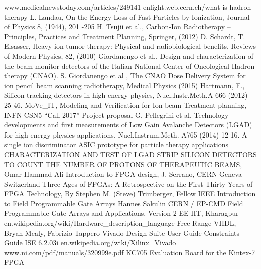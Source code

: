 \begin{thebibliography}{00}	
	www.medicalnewstoday.com/articles/249141
	enlight.web.cern.ch/what-is-hadron-therapy
	L. Landau, On the Energy Loss of Fast Particles by Ionization, Journal of
	Physics 8, (1944), 201 -205
	H. Tsujii et al., Carbon-Ion Radiotherapy – Principles, Practices and Treatment
	Planning, Springer, (2012)
	D. Schardt, T. Elsasser, Heavy-ion tumor therapy: Physical and radiobiological
	benefits, Reviews of Modern Physics, 82, (2010)
	Giordanengo et al., Design and characterization of the beam monitor detectors
	of the Italian National Center of Oncological Hadron-therapy (CNAO).
	S. Giordanengo et al , The CNAO Dose Delivery System for ion pencil beam
	scanning radiotherapy, Medical Physics (2015)
	Hartmann, F., Silicon tracking detectors in high energy physics, Nucl.Instr.Meth.A
	666 (2012) 25-46.
	MoVe\_IT, Modeling and Verification for Ion beam Treatment planning, INFN CSN5 “Call 2017” Project proposal
	G. Pellegrini et al, Technology developments and first measurements of Low Gain Avalanche Detectors (LGAD) for high energy physics applications, Nucl.Instrum.Meth. A765 (2014) 12-16.
	A single ion discriminator ASIC prototype for particle therapy applications
	CHARACTERIZATION AND TEST OF LGAD STRIP SILICON DETECTORS TO COUNT THE NUMBER OF PROTONS OF THERAPEUTIC BEAMS, Omar Hammad Ali
	Introduction to FPGA design, J. Serrano, CERN-Geneva-Switzerland
	Three Ages of FPGAs: A Retrospective on the First Thirty Years of FPGA Technology, By Stephen M. (Steve) Trimberger, Fellow IEEE
	Introduction to Field Programmable Gate Arrays Hannes Sakulin CERN / EP-CMD
	Field Programmable Gate Arrays and Applications, Version 2 EE IIT, Kharagpur
	en.wikipedia.org/wiki/Hardware\_description\_language
	Free Range VHDL, Bryan Mealy, Fabrizio Tappero
	Vivado Design Suite User Guide
	Constraints Guide ISE 6.2.03i
	en.wikipedia.org/wiki/Xilinx\_Vivado
	www.ni.com/pdf/manuals/320999e.pdf
	KC705 Evaluation Board for the Kintex-7 FPGA	

\end{thebibliography}
